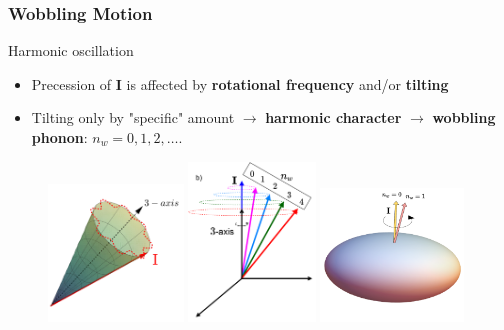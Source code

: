 \documentclass{beamer}
\begin{document}
\begin{frame}
	\frametitle{Wobbling Motion}
	\begin{exampleblock}{Harmonic oscillation}
		\begin{itemize}
			\item Precession of $\mathbf{I}$ is affected by \textbf{rotational frequency} and/or \textbf{tilting}
			\item Tilting only by "specific" amount $\rightarrow$ \textbf{harmonic character} $\rightarrow$ \textbf{wobbling phonon}: $n_w=0,1,2,\dots$.
		\end{itemize}
	\end{exampleblock}
	\begin{figure}
		\includegraphics[width=0.32\textwidth]{figures/precessional_cone_2.pdf}
		\includegraphics[width=0.3\textwidth]{figures/wobbling_n_schematic-2.pdf}
		\includegraphics[width=0.34\textwidth]{figures/triaxial-shapes-even-A.pdf}
	\end{figure}
\end{frame}
\end{document}
